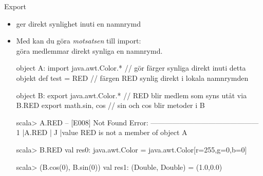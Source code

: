 \begin{Slide}{Export}
\begin{itemize}\SlideFontSmall
  \item {} ger direkt synlighet  inuti en namnrymd
  \item Med  kan du göra \emph{motsatsen} till import: \\
göra medlemmar direkt synliga  en namnrymd.
\begin{CodeSmall}
object A:
  import java.awt.Color.* // gör färger synliga direkt inuti detta objekt
  def test = RED          // färgen RED synlig direkt i lokala namnrymden

object B:
  export java.awt.Color.* // RED blir medlem som syns utåt via B.RED
  export math.{sin, cos}  // sin och cos blir metoder i B
\end{CodeSmall}

\begin{REPLsmall}
scala> A.RED
-- [E008] Not Found Error: ---------------------------------------------
1 |A.RED
  |^^^^^
  |value RED is not a member of object A

scala> B.RED
val res0: java.awt.Color = java.awt.Color[r=255,g=0,b=0]

scala> (B.cos(0), B.sin(0))
val res1: (Double, Double) = (1.0,0.0)
\end{REPLsmall}
\end{itemize}

\end{Slide}









